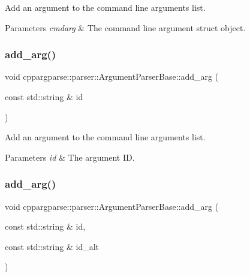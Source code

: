 Add an argument to the command line arguments list. 


\begin{DoxyParams}{Parameters}
{\em cmdarg} & The command line argument struct object. \\
\hline
\end{DoxyParams}
\mbox{\label{classcppargparse_1_1parser_1_1ArgumentParserBase_a020029da2da0147df81342a146a521b2}} 
\subsubsection{\texorpdfstring{add\+\_\+arg()}{add\_arg()}\hspace{0.1cm}{\footnotesize\ttfamily [2/4]}}
{\footnotesize\ttfamily void cppargparse\+::parser\+::\+Argument\+Parser\+Base\+::add\+\_\+arg (\begin{DoxyParamCaption}\item[{const std\+::string \&}]{id }\end{DoxyParamCaption})\hspace{0.3cm}{\ttfamily [inline]}}



Add an argument to the command line arguments list. 


\begin{DoxyParams}{Parameters}
{\em id} & The argument ID. \\
\hline
\end{DoxyParams}
\mbox{\label{classcppargparse_1_1parser_1_1ArgumentParserBase_a462c869315ff172aa7d02b45098b3e02}} 
\subsubsection{\texorpdfstring{add\+\_\+arg()}{add\_arg()}\hspace{0.1cm}{\footnotesize\ttfamily [3/4]}}
{\footnotesize\ttfamily void cppargparse\+::parser\+::\+Argument\+Parser\+Base\+::add\+\_\+arg (\begin{DoxyParamCaption}\item[{const std\+::string \&}]{id,  }\item[{const std\+::string \&}]{id\+\_\+alt }\end{DoxyParamCaption})\hspace{0.3cm}{\ttfamily [inline]}}



